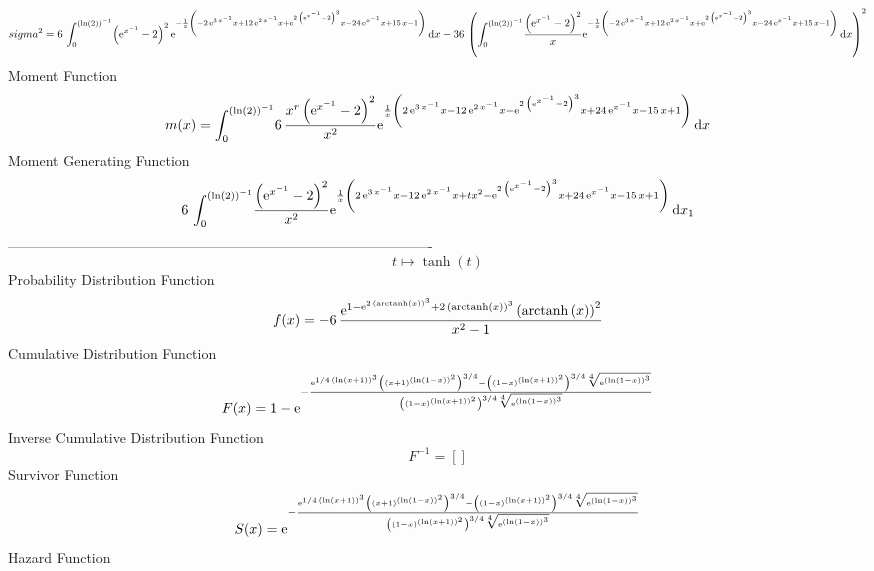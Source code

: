 \documentclass[12pt]{article}
\begin{document}
 $$ sigma^2 = 6\,\int_{0}^{ \left( \ln  \left( 2 \right)  \right) ^{-1}}\! \left( {
{\rm e}^{{x}^{-1}}}-2 \right) ^{2}{{\rm e}^{-{\frac {1}{x} \left( -2\,
{{\rm e}^{3\,{x}^{-1}}}x+12\,{{\rm e}^{2\,{x}^{-1}}}x+{{\rm e}^{2\,
 \left( {{\rm e}^{{x}^{-1}}}-2 \right) ^{3}}}x-24\,{{\rm e}^{{x}^{-1}}
}x+15\,x-1 \right) }}}\,{\rm d}x-36\, \left( \int_{0}^{ \left( \ln 
 \left( 2 \right)  \right) ^{-1}}\!{\frac { \left( {{\rm e}^{{x}^{-1}}
}-2 \right) ^{2}}{x}{{\rm e}^{-{\frac {1}{x} \left( -2\,{{\rm e}^{3\,{
x}^{-1}}}x+12\,{{\rm e}^{2\,{x}^{-1}}}x+{{\rm e}^{2\, \left( {{\rm e}^
{{x}^{-1}}}-2 \right) ^{3}}}x-24\,{{\rm e}^{{x}^{-1}}}x+15\,x-1
 \right) }}}}\,{\rm d}x \right) ^{2}
$$Moment Function 
 $$ m(x) = \int_{0}^{ \left( \ln  \left( 2 \right)  \right) ^{-1}}\!6\,{\frac {{x
}^{r} \left( {{\rm e}^{{x}^{-1}}}-2 \right) ^{2}}{{x}^{2}}{{\rm e}^{{
\frac {1}{x} \left( 2\,{{\rm e}^{3\,{x}^{-1}}}x-12\,{{\rm e}^{2\,{x}^{
-1}}}x-{{\rm e}^{2\, \left( {{\rm e}^{{x}^{-1}}}-2 \right) ^{3}}}x+24
\,{{\rm e}^{{x}^{-1}}}x-15\,x+1 \right) }}}}\,{\rm d}x
$$ Moment Generating Function 
 $$6\,\int_{0}^{ \left( \ln  \left( 2 \right)  \right) ^{-1}}\!{\frac {
 \left( {{\rm e}^{{x}^{-1}}}-2 \right) ^{2}}{{x}^{2}}{{\rm e}^{{\frac 
{1}{x} \left( 2\,{{\rm e}^{3\,{x}^{-1}}}x-12\,{{\rm e}^{2\,{x}^{-1}}}x
+t{x}^{2}-{{\rm e}^{2\, \left( {{\rm e}^{{x}^{-1}}}-2 \right) ^{3}}}x+
24\,{{\rm e}^{{x}^{-1}}}x-15\,x+1 \right) }}}}\,{\rm d}x_{{1}}
$$-------------------------------------------------------------------------------------------  \\$$t\mapsto \tanh \left( t \right) 
$$Probability Distribution Function 
$$  f(x)=-6\,{\frac {{{\rm e}^{1-{{\rm e}^{2\, \left( {\rm arctanh} \left(x
\right) \right) ^{3}}}+2\, \left( {\rm arctanh} \left(x\right)
 \right) ^{3}}} \left( {\rm arctanh} \left(x\right) \right) ^{2}}{{x}^
{2}-1}}
$$Cumulative Distribution Function  
 $$F(x)=1-{{\rm e}^{-{\frac {{{\rm e}^{1/4\, \left( \ln  \left( x+1 \right) 
 \right) ^{3}}} \left(  \left( x+1 \right) ^{ \left( \ln  \left( 1-x
 \right)  \right) ^{2}} \right) ^{3/4}- \left(  \left( 1-x \right) ^{
 \left( \ln  \left( x+1 \right)  \right) ^{2}} \right) ^{3/4}\sqrt [4]
{{{\rm e}^{ \left( \ln  \left( 1-x \right)  \right) ^{3}}}}}{ \left( 
 \left( 1-x \right) ^{ \left( \ln  \left( x+1 \right)  \right) ^{2}}
 \right) ^{3/4}\sqrt [4]{{{\rm e}^{ \left( \ln  \left( 1-x \right) 
 \right) ^{3}}}}}}}}
$$ Inverse Cumulative Distribution Function 
  $$F^{-1} = []
$$Survivor Function 
 $$ S(x)={{\rm e}^{-{\frac {{{\rm e}^{1/4\, \left( \ln  \left( x+1 \right) 
 \right) ^{3}}} \left(  \left( x+1 \right) ^{ \left( \ln  \left( 1-x
 \right)  \right) ^{2}} \right) ^{3/4}- \left(  \left( 1-x \right) ^{
 \left( \ln  \left( x+1 \right)  \right) ^{2}} \right) ^{3/4}\sqrt [4]
{{{\rm e}^{ \left( \ln  \left( 1-x \right)  \right) ^{3}}}}}{ \left( 
 \left( 1-x \right) ^{ \left( \ln  \left( x+1 \right)  \right) ^{2}}
 \right) ^{3/4}\sqrt [4]{{{\rm e}^{ \left( \ln  \left( 1-x \right) 
 \right) ^{3}}}}}}}}
$$ Hazard Function 
\end{document}
